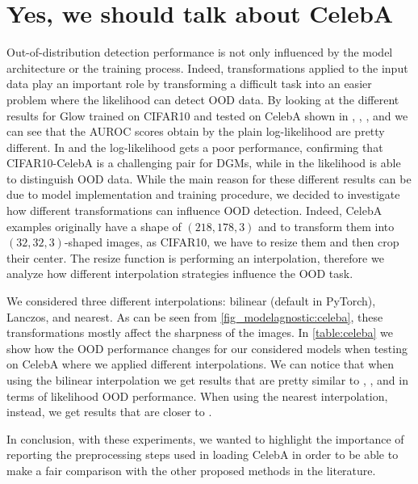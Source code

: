 {\section{Yes, we should talk about CelebA}
\label{appendix_modelagnostic:celeba}
Out-of-distribution detection performance is not only influenced by the model architecture or the training process. Indeed, transformations applied to the input data play an important role by transforming a difficult task into an easier problem where the likelihood can detect OOD data. By looking at the different results for Glow trained on CIFAR10 and tested on CelebA shown in \parencite{hendrycks_deep_2019}, \parencite{kirichenko_why_2020}, \parencite{morningstar_density_2021}, and \parencite{ahmadian_likelihoodfree_2021} we can see that the AUROC scores obtain by the plain log-likelihood are pretty different. In \parencite{hendrycks_deep_2019} and  \parencite{kirichenko_why_2020} the log-likelihood gets a poor performance, confirming that CIFAR10-CelebA is a challenging pair for DGMs, while in \parencite{morningstar_density_2021} the likelihood is able to distinguish OOD data. While the main reason for these different results can be due to model implementation and training procedure, we decided to investigate how different transformations can influence OOD detection. Indeed, CelebA examples originally have a shape of $(218, 178, 3)$ and to transform them into $(32, 32, 3)$-shaped images, as CIFAR10, we have to resize them and then crop their center. The resize function is performing an interpolation, therefore we analyze how different interpolation strategies influence the OOD task. 

We considered three different interpolations: bilinear (default in PyTorch), Lanczos, and nearest. As can be seen from \cref{fig_modelagnostic:celeba}, these transformations mostly affect the sharpness of the images. In \cref{table:celeba} we show how the OOD performance changes for our considered models when testing on CelebA where we applied different interpolations. We can notice that when using the bilinear interpolation we get results that are pretty similar to \parencite{hendrycks_deep_2019}, \parencite{kirichenko_why_2020}, and \parencite{ahmadian_likelihoodfree_2021} in terms of likelihood OOD performance. When using the nearest interpolation, instead, we get results that are closer to \parencite{morningstar_density_2021}. 

In conclusion, with these experiments, we wanted to highlight the importance of reporting the preprocessing steps used in loading CelebA in order to be able to make a fair comparison with the other proposed methods in the literature.


}
